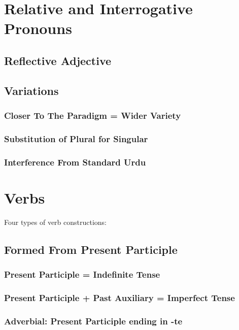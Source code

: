 \documentclass[a4paper]{article}
\begin{document}
\section{Relative and Interrogative Pronouns}

\subsection{Reflective Adjective}

\subsection{Variations}

\subsubsection{Closer To The Paradigm = Wider Variety}
\subsubsection{Substitution of Plural for Singular}
\subsubsection{Interference From Standard Urdu}

\section{Verbs}

Four types of verb constructions:

\subsection{Formed From Present Participle}

\subsubsection{Present Participle = Indefinite Tense}
\subsubsection{Present Participle + Past Auxiliary = Imperfect Tense}
\subsubsection{Adverbial: Present Participle ending in -te}
\end{document}
